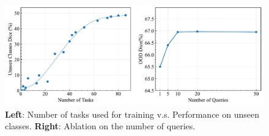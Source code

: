 \begin{figure}[t]
\begin{center}
\includegraphics[width=\columnwidth]{./fig/ablation.pdf}
\end{center}
\vspace{-1em}
\caption{\textbf{Left}: Number of tasks used for training v.s. Performance on unseen classes. \textbf{Right}: Ablation on the number of queries. }
\label{fig:ablation}
\vspace{-1em}
\end{figure}




\begin{table}[t]
\centering
\caption{Ablation study of different components in Iris. High-Res: high-resolution feature processing; Foreground: foreground feature pooling; Query: query-based contextual encoding.}
\label{tab:ablation}
\vspace{-1em}
\end{table}






